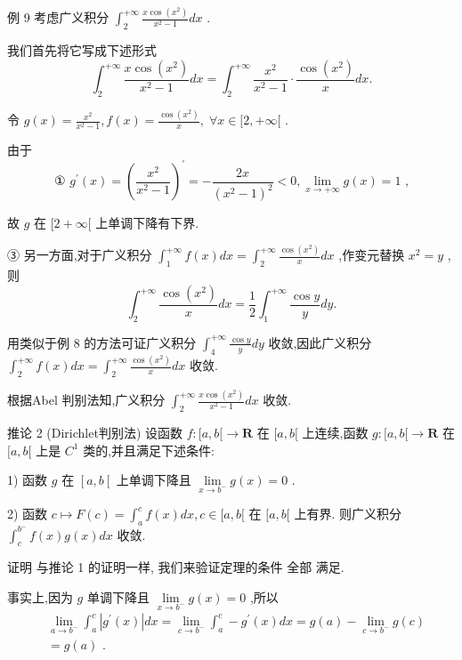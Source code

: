 例 9 考虑广义积分 ${\int }_{2}^{+\infty }\frac{x\cos \left( {x}^{2}\right) }{{x}^{2} - 1}{dx}$ .

我们首先将它写成下述形式
$${\int }_{2}^{+\infty }\frac{x\cos \left( {x}^{2}\right) }{{x}^{2} - 1}{dx} = {\int }_{2}^{+\infty }\frac{{x}^{2}}{{x}^{2} - 1} \cdot  \frac{\cos \left( {x}^{2}\right) }{x}{dx}.$$

令 $g\left( x\right)  = \frac{{x}^{2}}{{x}^{2} - 1},f\left( x\right)  = \frac{\cos \left( {x}^{2}\right) }{x},\;\forall x \in  \lbrack 2, + \infty \lbrack$ .

由于
$$\text{ ① }{g}^{\prime }\left( x\right)  = {\left( \frac{{x}^{2}}{{x}^{2} - 1}\right) }^{\prime } =  - \frac{2x}{{\left( {x}^{2} - 1\right) }^{2}} < 0,\mathop{\lim }\limits_{{x \rightarrow   + \infty }}g\left( x\right)  = 1\text{ , }$$

故 $g$ 在 $\lbrack 2 + \infty \lbrack$ 上单调下降有下界.

③ 另一方面,对于广义积分 ${\int }_{1}^{+\infty }f\left( x\right) {dx} = {\int }_{2}^{+\infty }\frac{\cos \left( {x}^{2}\right) }{x}{dx}$ ,作变元替换 ${x}^{2} = y$ ,则
$${\int }_{2}^{+\infty }\frac{\cos \left( {x}^{2}\right) }{x}{dx} = \frac{1}{2}{\int }_{1}^{+\infty }\frac{\cos y}{y}{dy}.$$

用类似于例 8 的方法可证广义积分 ${\int }_{4}^{+\infty }\frac{\cos y}{y}{dy}$ 收敛,因此广义积分 ${\int }_{2}^{+\infty }f\left( x\right) {dx} = {\int }_{2}^{+\infty }\frac{\cos \left( {x}^{2}\right) }{x}{dx}$ 收敛.

根据Abel 判别法知,广义积分 ${\int }_{2}^{+\infty }\frac{x\cos \left( {x}^{2}\right) }{{x}^{2} - 1}{dx}$ 收敛.

推论 2 (Dirichlet判别法) 设函数 $f : \lbrack a,b\lbrack  \rightarrow  \mathbf{R}$ 在 $\lbrack a,b\lbrack$ 上连续,函数 $g : \lbrack a,b\lbrack  \rightarrow  \mathbf{R}$ 在 $\lbrack a,b\lbrack$ 上是 ${C}^{1}$ 类的,并且满足下述条件:

1) 函数 $g$ 在 $\left\lbrack  {a,b\left\lbrack  \right. }\right.$ 上单调下降且 $\mathop{\lim }\limits_{{x \rightarrow  {b}^{ - }}}g\left( x\right)  = 0$ .

2) 函数 $c \mapsto  F\left( c\right)  = {\int }_{a}^{c}f\left( x\right) {dx},c \in  \lbrack a,b\lbrack$ 在 $\lbrack a,b\lbrack$ 上有界. 则广义积分 ${\int }_{c}^{{b}^{ - }}f\left( x\right) g\left( x\right) {dx}$ 收敛.

证明 与推论 1 的证明一样, 我们来验证定理的条件 全部 满足.

事实上,因为 $g$ 单调下降且 $\mathop{\lim }\limits_{{x \rightarrow  {b}^{ - }}}g\left( x\right)  = 0$ ,所以
\begin{align*}
	&\mathop{\lim }\limits_{{a \rightarrow  {b}^{ - }}}{\int }_{a}^{c}\left| {{g}^{\prime }\left( x\right) }\right| {dx} = \mathop{\lim }\limits_{{c \rightarrow  {b}^{ - }}}{\int }_{a}^{c} - {g}^{\prime }\left( x\right) {dx} = g\left( a\right)  - \mathop{\lim }\limits_{{c \rightarrow  {b}^{ - }}}g\left( c\right)\\
	&= g\left( a\right) \text{ . }
\end{align*}

